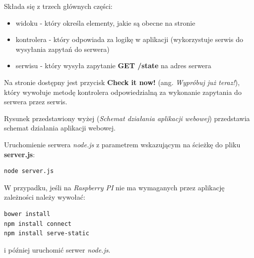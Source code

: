 Składa się z trzech głównych części:
\begin{itemize}
\item widoku - który określa elementy, jakie są obecne na stronie
\item kontrolera - który odpowiada za logikę w aplikacji (wykorzystuje serwis do wysyłania zapytań do serwera)
\item serwisu - który wysyła zapytanie \textbf{GET /state} na adres serwera
\end{itemize}

Na stronie dostępny jest przycisk \textbf{Check it now!} (ang. \textit{Wypróbuj już teraz!}), który wywołuje metodę kontrolera odpowiedzialną za wykonanie zapytania do serwera przez serwis.

\begin{center}
	\label{img:web_diagram}
\end{center}

Rysunek przedstawiony wyżej (\textit{Schemat działania aplikacji webowej}) przedstawia schemat działania aplikacji webowej.

Uruchomienie serwera \textit{node.js} z parametrem wskazującym na ścieżkę do pliku \textbf{server.js}:
\begin{lstlisting}
node server.js
\end{lstlisting}

W przypadku, jeśli na \textit{Raspberry PI} nie ma wymaganych przez aplikację zależności należy wywołać:
\begin{lstlisting}
bower install
npm install connect
npm install serve-static
\end{lstlisting}
i później uruchomić serwer \textit{node.js}.
%

